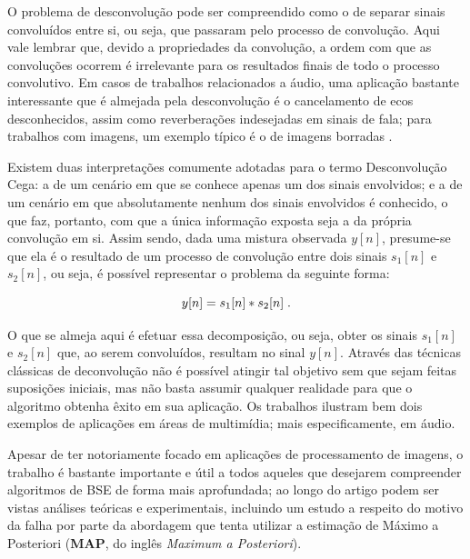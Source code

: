 O problema de desconvolução pode ser compreendido como o de separar sinais convoluídos entre si, ou seja, que passaram pelo processo de convolução. Aqui vale lembrar que, devido a propriedades da convolução, a ordem com que as convoluções ocorrem é irrelevante para os resultados finais de todo o processo convolutivo. Em casos de trabalhos relacionados a áudio, uma aplicação bastante interessante que é almejada pela desconvolução é o cancelamento de ecos desconhecidos, assim como reverberações indesejadas em sinais de fala; para trabalhos com imagens, um exemplo típico é o de imagens borradas \citep{Bell:1995:IAB:211676.211677}.

Existem duas interpretações comumente adotadas para o termo Desconvolução Cega: a de um cenário em que se conhece apenas um dos sinais envolvidos; e a de um cenário em que absolutamente nenhum dos sinais envolvidos é conhecido, o que faz, portanto, com que a única informação exposta seja a da própria convolução em si. Assim sendo, dada uma mistura observada $y[n]$, presume-se que ela é o resultado de um processo de convolução entre dois sinais $s_{1}[n]$ e $s_{2}[n]$, ou seja, é possível representar o problema da seguinte forma:

\begin{equation}
    y[n] = s_{1}[n] \ast s_{2}[n]
    \label{eq:bss_deconvolution}
    \hspace{0.1cm}.
    \vspace{0.2cm}
\end{equation}

O que se almeja aqui é efetuar essa decomposição, ou seja, obter os sinais $s_{1}[n]$ e $s_{2}[n]$ que, ao serem convoluídos, resultam no sinal $y[n]$. Através das técnicas clássicas de deconvolução não é possível atingir tal objetivo sem que sejam feitas suposições iniciais, mas não basta assumir qualquer realidade para que o algoritmo obtenha êxito em sua aplicação. Os trabalhos \citep{661479, 7077344} ilustram bem dois exemplos de aplicações em áreas de multimídia; mais especificamente, em áudio.


Apesar de ter notoriamente focado em aplicações de processamento de imagens, o trabalho \citep{levin2009understanding} é bastante importante e útil a todos aqueles que desejarem compreender algoritmos de BSE de forma mais aprofundada; ao longo do artigo podem ser vistas análises teóricas e experimentais, incluindo um estudo a respeito do motivo da falha por parte da abordagem que tenta utilizar a estimação de Máximo a Posteriori (\textbf{MAP}, do inglês \textit{Maximum a Posteriori}).






